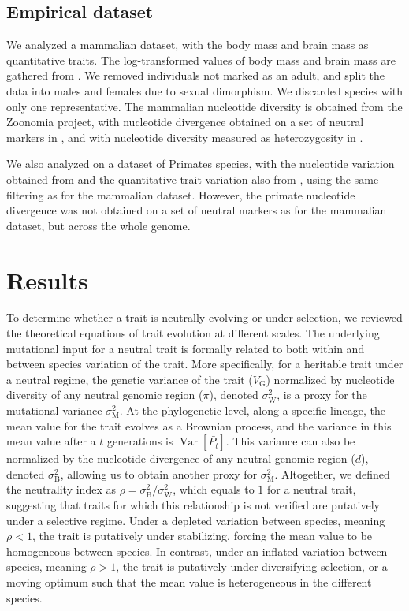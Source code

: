 \documentclass{article}
\DeclareMathOperator{\Var}{\text{Var}}
\newcommand{\Time}{t}
\newcommand{\Trait}{P}
\newcommand{\MeanTrait}{\bar{\Trait_{\Time}}}
\newcommand{\VarPhy}{\Var \left[\MeanTrait\right]}
\newcommand{\VarGenetic}{V_{\mathrm{G}}}
\newcommand{\RateMut}{\sigma^2_{\mathrm{M}}}
\newcommand{\RateBetween}{\sigma^2_{\mathrm{B}}}
\newcommand{\RateWhithin}{\sigma^2_{\mathrm{W}}}
\newcommand{\NI}{\rho}
\begin{document}
\subsection*{Empirical dataset}\label{subsec:empirical-dataset}

We analyzed a mammalian dataset, with the body mass and brain mass as quantitative traits.
The log-transformed values of body mass and brain mass are gathered from \textcite{tsuboi_breakdown_2018}.
We removed individuals not marked as an adult, and split the data into males and females due to sexual dimorphism.
We discarded species with only one representative.
The mammalian nucleotide diversity is obtained from the Zoonomia project, with nucleotide divergence obtained on a set of neutral markers in \textcite{foley_genomic_2023}, and with nucleotide diversity measured as heterozygosity in \textcite{wilder_contribution_2023}.


We also analyzed on a dataset of Primates species, with the nucleotide variation obtained from \textcite{kuderna_global_2023} and the quantitative trait variation also from \textcite{tsuboi_breakdown_2018}, using the same filtering as for the mammalian dataset.
However, the primate nucleotide divergence was not obtained on a set of neutral markers as for the mammalian dataset, but across the whole genome.

\section*{Results}\label{sec:results}

To determine whether a trait is neutrally evolving or under selection, we reviewed the theoretical equations of trait evolution at different scales.
The underlying mutational input for a neutral trait is formally related to both within and between species variation of the trait.
More specifically, for a heritable trait under a neutral regime, the genetic variance of the trait ($\VarGenetic$) normalized by nucleotide diversity of any neutral genomic region ($\pi$), denoted $\RateWhithin$, is a proxy for the mutational variance $\RateMut$.
At the phylogenetic level, along a specific lineage, the mean value for the trait evolves as a Brownian process, and the variance in this mean value after a $\Time$ generations is $\VarPhy$.
This variance can also be normalized by the nucleotide divergence of any neutral genomic region ($d$), denoted $\RateBetween$, allowing us to obtain another proxy for $\RateMut$.
Altogether, we defined the neutrality index as $\NI = \RateBetween/\RateWhithin$, which equals to $1$ for a neutral trait, suggesting that traits for which this relationship is not verified are putatively under a selective regime.
Under a depleted variation between species, meaning $\NI < 1$, the trait is putatively under stabilizing, forcing the mean value to be homogeneous between species.
In contrast, under an inflated variation between species, meaning $\NI > 1$, the trait is putatively under diversifying selection, or a moving optimum such that the mean value is heterogeneous in the different species.
\end{document}
